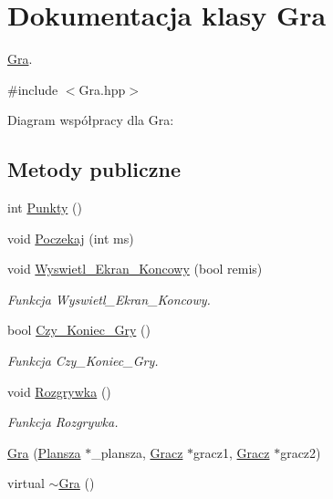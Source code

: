 \hypertarget{class_gra}{\section{Dokumentacja klasy Gra}
\label{class_gra}
}


\hyperlink{class_gra}{Gra}.  




{\ttfamily \#include $<$Gra.\-hpp$>$}



Diagram współpracy dla Gra\-:
\subsection*{Metody publiczne}
\begin{DoxyCompactItemize}
\item 
int \hyperlink{class_gra_a78d1ed1df2847c77e3cd845e59e97643}{Punkty} ()
\item 
void \hyperlink{class_gra_ad2b90b36ffe7d4e9b780ade2cfad5e2d}{Poczekaj} (int ms)
\item 
void \hyperlink{class_gra_ad34dabd89983f8c09b7806ca18e2f112}{Wyswietl\-\_\-\-Ekran\-\_\-\-Koncowy} (bool remis)
\begin{DoxyCompactList}\small\item\em Funkcja Wyswietl\-\_\-\-Ekran\-\_\-\-Koncowy. \end{DoxyCompactList}\item 
bool \hyperlink{class_gra_a0833e03ef8463b2264e369067fa1435b}{Czy\-\_\-\-Koniec\-\_\-\-Gry} ()
\begin{DoxyCompactList}\small\item\em Funkcja Czy\-\_\-\-Koniec\-\_\-\-Gry. \end{DoxyCompactList}\item 
void \hyperlink{class_gra_a7f2a68af5fb031ec322c1dfebf1cc641}{Rozgrywka} ()
\begin{DoxyCompactList}\small\item\em Funkcja Rozgrywka. \end{DoxyCompactList}\item 
\hyperlink{class_gra_a27aba752f47f2b98143656f5a782ee70}{Gra} (\hyperlink{class_plansza}{Plansza} $\ast$\-\_\-plansza, \hyperlink{class_gracz}{Gracz} $\ast$gracz1, \hyperlink{class_gracz}{Gracz} $\ast$gracz2)
\item 
virtual \hyperlink{class_gra_add375b896f5dc3b2ddfb0d145b43f740}{$\sim$\-Gra} ()
\end{DoxyCompactItemize}

